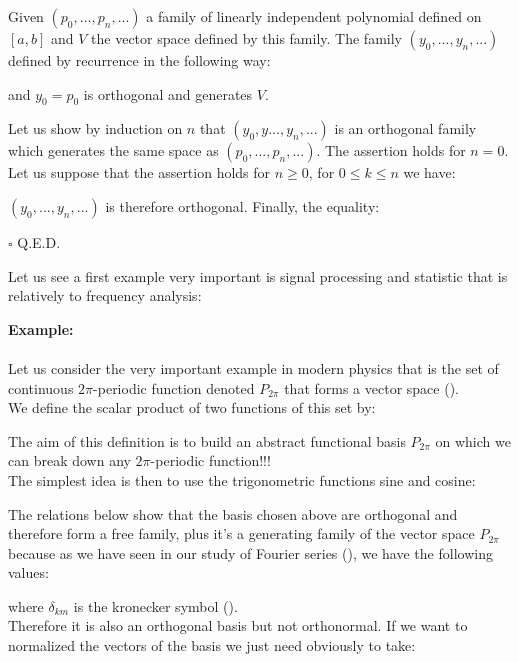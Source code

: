 	\begin{theorem}
	Given $(p_0,...,p_n,...)$ a family of linearly independent polynomial defined on $[a,b]$ and $V$ the vector space defined by this family. The family $(y_0,...,y_n,...)$ defined by recurrence in the following way:
	
	and $y_0=p_0$ is orthogonal and generates $V$.
	\end{theorem}
	\begin{dem}
	Let us show by induction on $n$ that $(y_0,y...,y_n,...)$ is an orthogonal family which generates the same space as $(p_0,...,p_n,...)$. The assertion holds for $n=0$. Let us suppose that the assertion holds for $n\geq 0$, for $0\leq k\leq n$ we have:
	
	$(y_0,...,y_n,...)$ is therefore orthogonal. Finally, the equality:	
	
	\begin{flushright}
		$\square$  Q.E.D.
	\end{flushright}
	\end{dem}
	Let us see a first example very important is signal processing and statistic that is relatively to frequency analysis:
	\begin{tcolorbox}[colframe=black,colback=white,sharp corners]
	\textbf{{\Large {}}Example:}\\\\
	Let us consider the very important example in modern physics that is the set of continuous $2\pi$-periodic function denoted $P_{2\pi}$ that forms a vector space ().\\
	
	We define the scalar product of two functions of this set by:
	
	The aim of this definition is to build an abstract functional basis $P_{2\pi}$ on which we can break down any $2\pi$-periodic function!!!\\
	
	The simplest idea is then to use the trigonometric functions sine and cosine:
	
	The relations below show that the basis chosen above are orthogonal and therefore form a free family, plus it's a generating family of the vector space $P_{2\pi}$ because as we have seen in our study of Fourier series (), we have the following values:
	
	where $\delta_{km}$ is the kronecker symbol ().\\
	
	Therefore it is also an orthogonal basis but not orthonormal. If we want to normalized the vectors of the basis we just need obviously to take:
	
	\end{tcolorbox}
